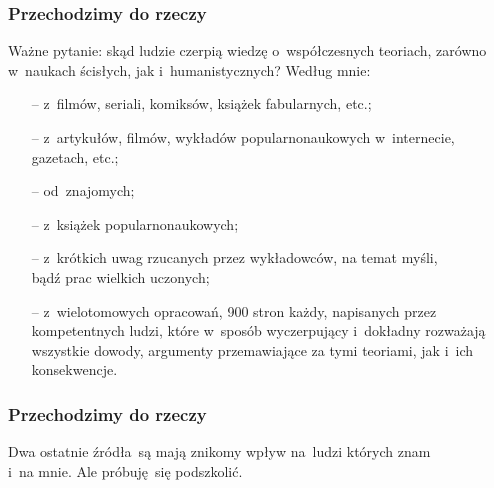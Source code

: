 \documentclass[10pt,t]{beamer}
\begin{document}
\begin{frame}
  \frametitle{Przechodzimy do rzeczy}

  Ważne pytanie: skąd ludzie czerpią wiedzę o~współczesnych teoriach,
  zarówno w~naukach ścisłych, jak i~humanistycznych? Według mnie:
  \begin{itemize}

  \item[--] z~filmów, seriali, komiksów, książek fabularnych, etc.;

  \item[--] z~artykułów, filmów, wykładów popularnonaukowych
    w~internecie, gazetach, etc.;

  \item[--] od~znajomych;

  \item[--] z~książek popularnonaukowych;

  \item[--] z~krótkich uwag rzucanych przez wykładowców, na temat
    myśli, \\
    bądź prac wielkich uczonych;

  \item[--] z~wielotomowych opracowań, 900 stron każdy, napisanych
    przez kompetentnych ludzi, które w~sposób wyczerpujący
    i~dokładny rozważają wszystkie dowody, argumenty przemawiające
    za tymi teoriami, jak i~ich konsekwencje.

  \end{itemize}

\end{frame}





\begin{frame}
  \frametitle{Przechodzimy do rzeczy}


  Dwa ostatnie źródła~są mają znikomy wpływ na~ludzi których znam \\
  i~na mnie. Ale próbuję~się podszkolić.

\end{frame}
\end{document}
